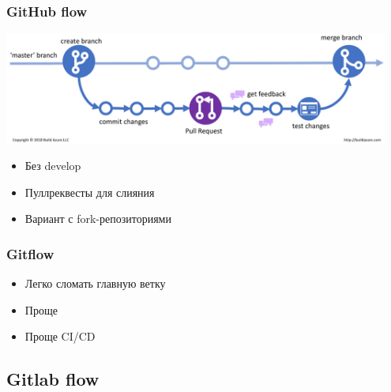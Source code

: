 \documentclass{../../slides-style}
\begin{document}
    \begin{frame}
        \frametitle{GitHub flow}
        \begin{center}
            \includegraphics[width=0.95\textwidth]{gitHubFlow.png}
        \end{center}
        \begin{itemize}
            \item Без develop
            \item Пуллреквесты для слияния
            \item Вариант с fork-репозиториями
        \end{itemize}
    \end{frame}

    \begin{frame}
        \frametitle{Gitflow}
        \begin{itemize}
            \item Легко сломать главную ветку
            \item Проще
            \item Проще CI/CD
        \end{itemize}
    \end{frame}

    \subsection{Gitlab flow}
\end{document}
